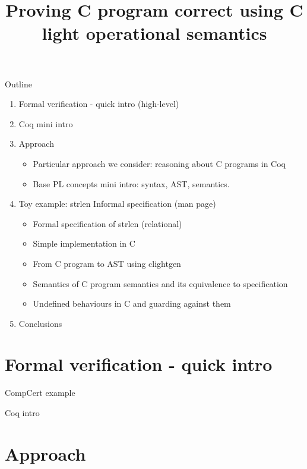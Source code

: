 \documentclass{beamer}
\title{Proving C program correct using C light operational semantics}
\date{ }
\begin{document}
\maketitle

\begin{frame}{Outline}
\begin{enumerate}
\item Formal verification - quick intro (high-level)
\item Coq mini intro 

\item Approach
\begin{itemize}   
\item Particular approach we consider: reasoning about C programs in Coq
\item Base PL concepts mini intro: syntax, AST, semantics.
\end{itemize}{}
\item Toy example: strlen Informal specification (man page)
\begin{itemize}

\item Formal specification of strlen (relational)
\item Simple implementation in C
\item From C program to AST using clightgen
\item Semantics of C program semantics and its equivalence to specification
\item Undefined behaviours in C and guarding against them
\end{itemize}{}
\item Conclusions
\end{enumerate} 
\end{frame}{}

\section{Formal verification - quick intro}
\begin{frame}
CompCert example
\end{frame}
\begin{frame}{Coq intro}
\end{frame}

\section{Approach}
\end{document}
